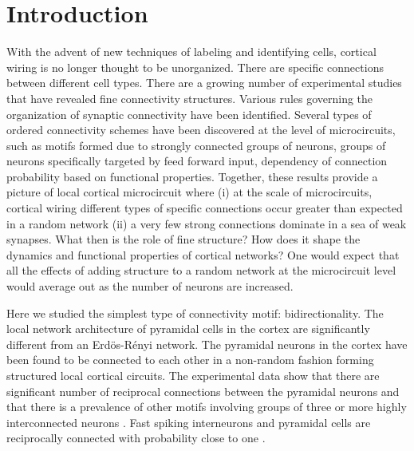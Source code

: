 \section{Introduction}
With the advent of new techniques of labeling and identifying cells, cortical wiring is no longer thought to be unorganized. There are specific connections between different cell types. There are a growing number of experimental studies that have revealed fine connectivity structures. Various rules governing the organization of synaptic connectivity have been identified. Several types of ordered connectivity schemes have been discovered at the level of microcircuits, such as motifs formed due to strongly connected groups of neurons, groups of neurons specifically targeted by feed forward input, dependency of connection probability based on functional properties.  Together, these results provide a picture of local cortical microcircuit where (i) at the scale of microcircuits, cortical wiring different types of specific connections occur greater than expected in a random network (ii) a very few strong connections dominate in a sea of weak synapses. What then is the role of fine structure? How does it shape the dynamics and functional properties of cortical networks? One would expect that all the effects of adding structure to a random network at the microcircuit level would average out as the number of neurons are increased.

Here we studied the simplest type of connectivity motif: bidirectionality. The local network architecture of pyramidal cells in the cortex are significantly different from an Erdös-Rényi network. The pyramidal neurons in the cortex have been found to be connected to each other in a non-random fashion forming structured local cortical circuits. The experimental data show that there are significant number of reciprocal connections between the pyramidal neurons and that there is a prevalence of other motifs involving groups of three or more highly interconnected neurons \cite{markram1997,thomson2002, Song2005, Perin2011}. Fast spiking interneurons and pyramidal cells are reciprocally connected with probability close to one \cite{Yoshimura2005}. 

